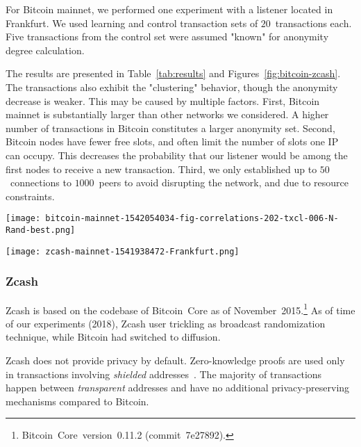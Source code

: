For Bitcoin mainnet, we performed one experiment with a listener located in Frankfurt.
We used learning and control transaction sets of $20$~transactions each.
Five transactions from the control set were assumed "known" for anonymity degree calculation.

The results are presented in Table~\ref{tab:results} and Figures~\ref{fig:bitcoin-zcash}.
The transactions also exhibit the "clustering" behavior, though the anonymity decrease is weaker.
This may be caused by multiple factors.
First, Bitcoin mainnet is substantially larger than other networks we considered.
A higher number of transactions in Bitcoin constitutes a larger anonymity set.
Second, Bitcoin nodes have fewer free slots, and often limit the number of slots one IP can occupy.
This decreases the probability that our listener would be among the first nodes to receive a new transaction.
Third, we only established up to $50$~connections to $1000$~peers to avoid disrupting the network, and due to resource constraints.

\begin{figure*}
	\centering
	\begin{minipage}{0.5\textwidth}
		\centering
		\texttt{[image: bitcoin-mainnet-1542054034-fig-correlations-202-txcl-006-N-Rand-best.png]}
		\caption{Bitcoin mainnet}
	\end{minipage}\hfill
	\begin{minipage}{0.5\textwidth}
		\centering
		\texttt{[image: zcash-mainnet-1541938472-Frankfurt.png]}
		\caption{Zcash}
	\end{minipage}\hfill
	\label{fig:bitcoin-zcash}
\end{figure*}

\subsubsection{Zcash}

Zcash is based on the codebase of Bitcoin~Core as of November~2015.\footnote{Bitcoin~Core~version~0.11.2 (commit~7e27892).}
As of time of our experiments (2018), Zcash user trickling as broadcast randomization technique, while Bitcoin had switched to diffusion.

Zcash does not provide privacy by default.
Zero-knowledge proofs are used only in transactions involving \textit{shielded} addresses~\cite{Kappos2018}.
The majority of transactions happen between \textit{transparent} addresses and have no additional privacy-preserving mechanisms compared to Bitcoin.

